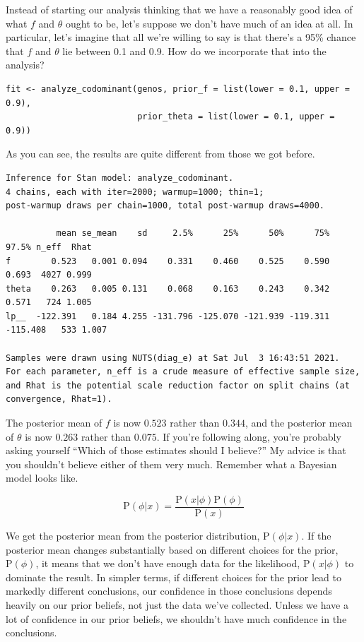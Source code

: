 Instead of starting our analysis thinking that we have a reasonably
good idea of what $f$ and $\theta$ ought to be, let's suppose we don't
have much of an idea at all. In particular, let's imagine that all
we're willing to say is that there's a 95\% chance that $f$ and
$\theta$ lie between 0.1 and 0.9. How do we incorporate that into the
analysis?

\begin{verbatim}
fit <- analyze_codominant(genos, prior_f = list(lower = 0.1, upper = 0.9), 
                          prior_theta = list(lower = 0.1, upper = 0.9))
\end{verbatim}
As you can see, the results are quite different from those we got
before.

{\small
\begin{verbatim}
Inference for Stan model: analyze_codominant.
4 chains, each with iter=2000; warmup=1000; thin=1; 
post-warmup draws per chain=1000, total post-warmup draws=4000.

          mean se_mean    sd     2.5%      25%      50%      75%    97.5% n_eff  Rhat
f        0.523   0.001 0.094    0.331    0.460    0.525    0.590    0.693  4027 0.999
theta    0.263   0.005 0.131    0.068    0.163    0.243    0.342    0.571   724 1.005
lp__  -122.391   0.184 4.255 -131.796 -125.070 -121.939 -119.311 -115.408   533 1.007

Samples were drawn using NUTS(diag_e) at Sat Jul  3 16:43:51 2021.
For each parameter, n_eff is a crude measure of effective sample size,
and Rhat is the potential scale reduction factor on split chains (at 
convergence, Rhat=1).
\end{verbatim}
}

The posterior mean of $f$ is now $0.523$ rather than $0.344$, and the
posterior mean of $\theta$ is now $0.263$ rather than $0.075$. If
you're following along, you're probably asking yourself ``Which of
those estimates should I believe?'' My advice is that you shouldn't
believe either of them very much. Remember what a Bayesian model looks
like.

$$
\mbox{P}(\phi|x) = \frac{\mbox{P}(x|\phi)\mbox{P}(\phi)}{\mbox{P}(x)}
$$

\noindent We get the posterior mean from the posterior distribution,
$\mbox{P}(\phi|x)$. If the posterior mean changes substantially based
on different choices for the prior, $\mbox{P}(\phi)$, it means that we
don't have enough data for the likelihood, $\mbox{P}(x|\phi)$ to
dominate the result. In simpler terms, if different choices for the
prior lead to markedly different conclusions, our confidence in those
conclusions depends heavily on our prior beliefs, not just the data
we've collected. Unless we have a lot of confidence in our prior
beliefs, we shouldn't have much confidence in the conclusions.

